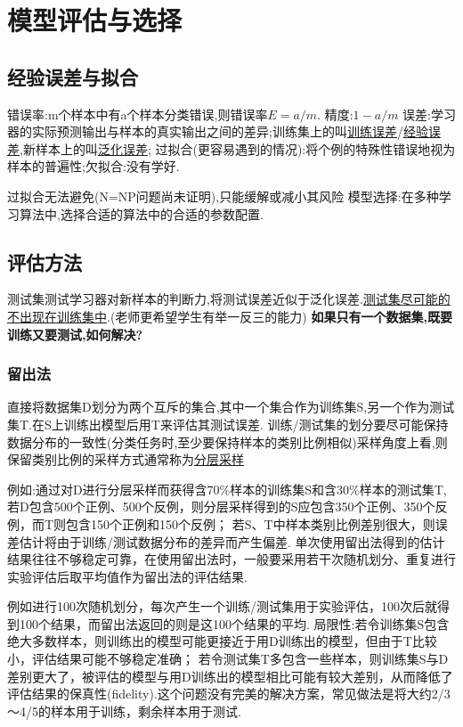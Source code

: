 \chapter{模型评估与选择}
\section{经验误差与拟合}
\myitem 错误率:m个样本中有a个样本分类错误,则错误率$E=a/m$.
\myitem 精度:$1-a/m$
\myitem 误差:学习器的实际预测输出与样本的真实输出之间的差异;训练集上的叫\underline{训练误差}/\underline{经验误差},新样本上的叫\underline{泛化误差};
\myitem 过拟合(更容易遇到的情况):将个例的特殊性错误地视为样本的普遍性;欠拟合:没有学好.
\par 过拟合无法避免(N=NP问题尚未证明),只能缓解或减小其风险
\myitem 模型选择:在多种学习算法中,选择合适的算法中的合适的参数配置.
\section{评估方法}
\setcounter{mycounter}{0}
\myitem 测试集测试学习器对新样本的判断力,将测试误差近似于泛化误差.\underline{测试集尽可能的不出现在训练集中}.(老师更希望学生有举一反三的能力)
\myitem \textbf{如果只有一个数据集,既要训练又要测试,如何解决?}
\subsection{留出法}
\setcounter{mycounter}{0}
直接将数据集D划分为两个互斥的集合,其中一个集合作为训练集S,另一个作为测试集T.在S上训练出模型后用T来评估其测试误差.
\myitem 训练/测试集的划分要尽可能保持数据分布的一致性(分类任务时,至少要保持样本的类别比例相似)采样角度上看,则保留类别比例的采样方式通常称为\underline{分层采样}\par
例如:通过对D进行分层采样而获得含70\%样本的训练集S和含30\%样本的测试集T,
若D包含500个正例、500个反例，则分层采样得到的S应包含350个正例、350个反例，而T则包含150个正例和150个反例；
若S、T中样本类别比例差别很大，则误差估计将由于训练/测试数据分布的差异而产生偏差.
\myitem 单次使用留出法得到的估计结果往往不够稳定可靠，在使用留出法时，一般要采用若干次随机划分、重复进行实验评估后取平均值作为留出法的评估结果.\par
例如进行100次随机划分，每次产生一个训练/测试集用于实验评估，100次后就得到100个结果，而留出法返回的则是这100个结果的平均.
\myitem 局限性:若令训练集S包含绝大多数样本，则训练出的模型可能更接近于用D训练出的模型，但由于T比较小，评估结果可能不够稳定准确；
若令测试集T多包含一些样本，则训练集S与D差别更大了，被评估的模型与用D训练出的模型相比可能有较大差别，从而降低了评估结果的保真性(fidelity).这个问题没有完美的解决方案，常见做法是将大约2/3～4/5的样本用于训练，剩余样本用于测试.
